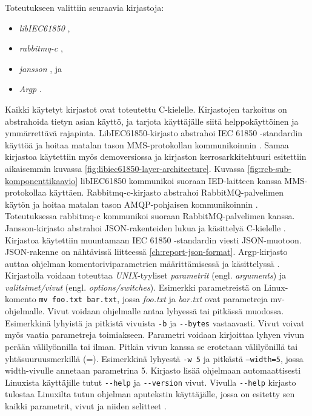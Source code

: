 Toteutukseen valittiin seuraavia kirjastoja:
\begin{itemize}
	\item \emph{libIEC61850} \cite{libIEC61850-repo},
	\item \emph{rabbitmq-c} \cite{rabbitmq-c-repo},
	\item \emph{jansson} \cite{jansson-repo}, ja
	\item \emph{Argp} \cite{argp-glibc-guide}.
\end{itemize}
Kaikki käytetyt kirjastot ovat toteutettu C-kielelle. Kirjastojen tarkoitus on abstrahoida tietyn asian käyttö, ja tarjota käyttäjälle siitä helppokäyttöinen ja ymmärrettävä rajapinta. LibIEC61850-kirjasto abstrahoi IEC 61850 -standardin käyttöä ja hoitaa matalan tason MMS-protokollan kommunikoinnin \cite{libIEC61850-repo}. Samaa kirjastoa käytettiin myös demoversiossa ja kirjaston kerrosarkkitehtuuri esitettiin aikaisemmin kuvassa \ref{fig:libiec61850-layer-architecture}. Kuvassa \ref{fig:rcb-sub-komponenttikaavio} libIEC61850 kommunikoi suoraan IED\--\-lait\-teen kanssa MMS-protokollaa käyttäen. Rabbitmq-c-kirjasto abstrahoi RabbitMQ-palvelimen käytön ja hoitaa matalan tason AMQP-pohjaisen kommunikoinnin \cite{rabbitmq-c-repo}. Toteutuksessa rabbitmq-c kommunikoi suoraan RabbitMQ-palvelimen kanssa. Jansson-kirjasto abstrahoi JSON-rakenteiden lukua ja käsittelyä C-kielelle \cite{jansson-repo}. Kirjastoa käytettiin muuntamaan IEC 61850 -standardin viesti JSON-muotoon. JSON-rakenne on nähtävissä liitteessä \ref{ch:report-json-format}. Argp-kirjasto auttaa ohjelman komentoriviparametrien määrittämisessä ja käsittelyssä \cite{argp-glibc-guide}. Kirjastolla voidaan toteuttaa \emph{UNIX}-tyyliset \emph{parametrit} (engl. \emph{arguments}) ja \emph{valitsimet/vivut} (engl. \emph{options/switches}). Esimerkki parametreistä on Linux-komento \texttt{mv foo.txt bar.txt}, jossa \emph{foo.txt} ja \emph{bar.txt} ovat parametreja mv-ohjelmalle. Vivut voidaan ohjelmalle antaa lyhyessä tai pitkässä muodossa. Esimerkkinä lyhyistä ja pitkistä vivuista \texttt{-b} ja \texttt{-{}-bytes} vastaavasti. Vivut voivat myös vaatia parametreja toimiakseen. Parametri voidaan kirjoittaa lyhyen vivun perään välilyönnilla tai ilman. Pitkän vivun kanssa se erotetaan välilyönillä tai yhtäsuuruusmerkillä (=). Esimerkkinä lyhyestä \texttt{-w 5} ja pitkästä \texttt{--width=5}, jossa width-vivulle annetaan parametrina 5. Kirjasto lisää ohjelmaan automaattisesti Linuxista käyttäjille tutut \texttt{-{}-help} ja \texttt{-{}-version} vivut. Vivulla \texttt{-{}-help} kirjasto tulostaa Linuxilta tutun ohjelman aputekstin käyttäjälle, jossa on esitetty sen kaikki parametrit, vivut ja niiden selitteet \cite{step-by-step-into-argp}.

